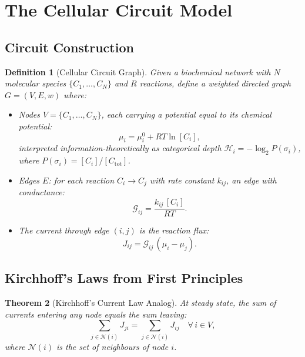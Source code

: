 \documentclass[11pt,twocolumn,a4paper]{article}
\newtheorem{theorem}{Theorem}[section]
\newtheorem{definition}[theorem]{Definition}
\newcommand{\Hcat}{\mathcal{H}}
\newcommand{\Gcond}{\mathcal{G}}
\begin{document}
\section{The Cellular Circuit Model}
\label{sec:circuit-model}

\subsection{Circuit Construction}

\begin{definition}[Cellular Circuit Graph]
\label{def:circuit}
Given a biochemical network with $N$ molecular species
$\{C_1, \ldots, C_N\}$ and $R$ reactions, define a weighted directed
graph $G = (V, E, w)$ where:
\begin{itemize}[leftmargin=*,nosep]
\item Nodes $V = \{C_1, \ldots, C_N\}$, each carrying a \emph{potential}
  equal to its chemical potential:
  \begin{equation}
    \mu_i = \mu_i^0 + RT \ln [C_i],
    \label{eq:chemical-potential}
  \end{equation}
  interpreted information-theoretically as categorical depth
  $\Hcat_i = -\log_2 P(\sigma_i)$, where $P(\sigma_i) = [C_i]/[C_\mathrm{tot}]$.

\item Edges $E$: for each reaction $C_i \to C_j$ with rate constant
  $k_{ij}$, an edge with \emph{conductance}:
  \begin{equation}
    \Gcond_{ij} = \frac{k_{ij}\,[C_i]}{RT}.
    \label{eq:conductance}
  \end{equation}

\item The \emph{current} through edge $(i,j)$ is the reaction flux:
  \begin{equation}
    J_{ij} = \Gcond_{ij}\,(\mu_i - \mu_j).
    \label{eq:current}
  \end{equation}
\end{itemize}
\end{definition}

\subsection{Kirchhoff's Laws from First Principles}

\begin{theorem}[Kirchhoff's Current Law Analog]
\label{thm:kcl}
At steady state, the sum of currents entering any node equals the sum
leaving:
\begin{equation}
  \sum_{j \in \mathcal{N}(i)} J_{ji} = \sum_{j \in \mathcal{N}(i)} J_{ij}
  \quad \forall\, i \in V,
  \label{eq:kcl}
\end{equation}
where $\mathcal{N}(i)$ is the set of neighbours of node $i$.
\end{theorem}
\end{document}
